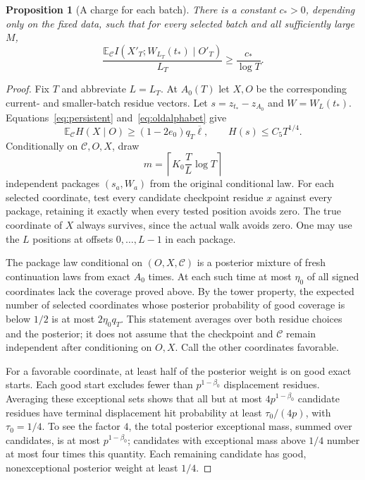 \documentclass[11pt]{article}
\numberwithin{equation}{section}
\newtheorem{proposition}[theorem]{Proposition}
\theoremstyle{definition}\newtheorem{definition}[theorem]{Definition}
\theoremstyle{remark}\newtheorem{remark}[theorem]{Remark}
\newcommand{\E}{\mathbb E}\newcommand{\Prob}{\mathbb P}
\newcommand{\Lb}{\overline{\ell}}
\begin{document}
\begin{proposition}[A charge for each batch]\label{prop:charge}
There is a constant $c_*>0$, depending only on the fixed data, such that for every selected batch and all sufficiently large $M$,
\[
 \frac{\E_{\mathcal C} I(X'_T;W_{L_T}(t_*)\mid O'_T)}{L_T}
 \ge\frac{c_*}{\log T}.
\]
\end{proposition}
\begin{proof}
Fix $T$ and abbreviate $L=L_T$. At $A_0(T)$ let $X,O$ be the corresponding current- and smaller-batch residue vectors. Let $s=z_{t_*}-z_{A_0}$ and $W=W_L(t_*)$. Equations~\eqref{eq:persistent} and~\eqref{eq:oldalphabet} give
\begin{equation}\label{eq:initialinformation}
 \E_{\mathcal C}H(X\mid O)\ge(1-2e_0)q_T\Lb,
 \qquad H(s)\le C_5T^{1/4}.
\end{equation}
Conditionally on $\mathcal C,O,X$, draw
\[
 m=\left\lceil K_0\frac TL\log T\right\rceil
\]
independent packages $(s_a,W_a)$ from the original conditional law. For each selected coordinate, test every candidate checkpoint residue $x$ against every package, retaining it exactly when every tested position avoids zero. The true coordinate of $X$ always survives, since the actual walk avoids zero. One may use the $L$ positions at offsets $0,\ldots,L-1$ in each package.

The package law conditional on $(O,X,\mathcal C)$ is a posterior mixture of fresh continuation laws from exact $A_0$ times. At each such time at most $\eta_0$ of all signed coordinates lack the coverage proved above. By the tower property, the expected number of selected coordinates whose posterior probability of good coverage is below $1/2$ is at most $2\eta_0q_T$. This statement averages over both residue choices and the posterior; it does not assume that the checkpoint and $\mathcal C$ remain independent after conditioning on $O,X$. Call the other coordinates favorable.

For a favorable coordinate, at least half of the posterior weight is on good exact starts. Each good start excludes fewer than $p^{1-\beta_0}$ displacement residues. Averaging these exceptional sets shows that all but at most $4p^{1-\beta_0}$ candidate residues have terminal displacement hit probability at least $\tau_0/(4p)$, with $\tau_0=1/4$. To see the factor $4$, the total posterior exceptional mass, summed over candidates, is at most $p^{1-\beta_0}$; candidates with exceptional mass above $1/4$ number at most four times this quantity. Each remaining candidate has good, nonexceptional posterior weight at least $1/4$.


\end{proof}
\end{document}
